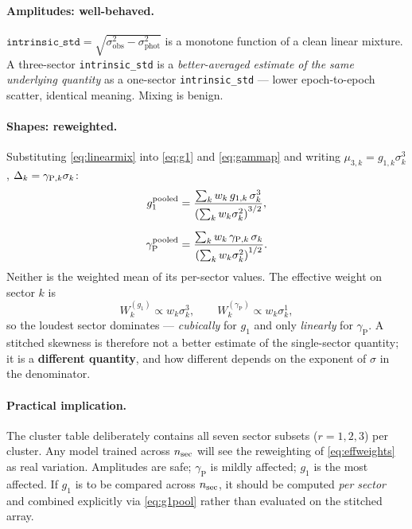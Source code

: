 \documentclass[11pt]{article}
\newcommand{\istd}{\texttt{intrinsic\_std}}
\newcommand{\gp}{\gamma_{\mathrm{P}}}
\newcommand{\sigobs}{\sigma_{\mathrm{obs}}}
\newcommand{\sigphot}{\sigma_{\mathrm{phot}}}
\begin{document}
\paragraph{Amplitudes: well-behaved.} $\istd = \sqrt{\sigobs^2 - \sigphot^2}$ is a
monotone function of a clean linear mixture. A three-sector \istd{} is a
\emph{better-averaged estimate of the same underlying quantity} as a one-sector
\istd{} --- lower epoch-to-epoch scatter, identical meaning. Mixing is benign.

\paragraph{Shapes: reweighted.} Substituting \eqref{eq:linearmix} into
\eqref{eq:g1} and \eqref{eq:gammap} and writing $\mu_{3,k} = g_{1,k}\sigma_k^3$,
$\Delta_k = \gamma_{{\rm P},k}\sigma_k$:
%
\begin{align}
  g_1^{\mathrm{pooled}}
    &= \frac{\sum_k w_k\, g_{1,k}\,\sigma_k^{3}}
            {\left(\sum_k w_k \sigma_k^{2}\right)^{3/2}},
  \label{eq:g1pool}\\[6pt]
  \gp^{\mathrm{pooled}}
    &= \frac{\sum_k w_k\, \gamma_{{\rm P},k}\,\sigma_k}
            {\left(\sum_k w_k \sigma_k^{2}\right)^{1/2}} .
  \label{eq:gppool}
\end{align}
%
Neither is the weighted mean of its per-sector values. The effective weight on
sector $k$ is
%
\begin{equation}
  W_k^{(g_1)} \propto w_k \sigma_k^{3},
  \qquad
  W_k^{(\gp)} \propto w_k \sigma_k^{1},
  \label{eq:effweights}
\end{equation}
%
so the loudest sector dominates --- \emph{cubically} for $g_1$ and only
\emph{linearly} for $\gp$. A stitched skewness is therefore not a better estimate
of the single-sector quantity; it is a \textbf{different quantity}, and how
different depends on the exponent of $\sigma$ in the denominator.

\paragraph{Practical implication.} The cluster table deliberately contains all
seven sector subsets ($r = 1,2,3$) per cluster. Any model trained across
$n_{\rm sec}$ will see the reweighting of \eqref{eq:effweights} as real variation.
Amplitudes are safe; $\gp$ is mildly affected; $g_1$ is the most affected. If
$g_1$ is to be compared across $n_{\rm sec}$, it should be computed \emph{per
sector} and combined explicitly via \eqref{eq:g1pool} rather than evaluated on
the stitched array.
\end{document}
